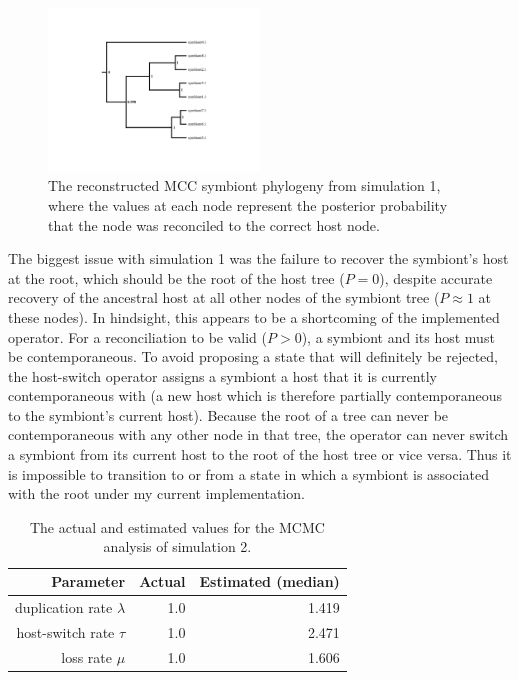 \documentclass[12pt,letterpaper]{article}
\begin{document}
\begin{figure}
\centering
\includegraphics[width=0.5\textwidth]{figures/sim2.pdf}
\caption{The reconstructed \ac{MCC} symbiont phylogeny from simulation 1, where the values at each node represent the posterior probability that the node was reconciled to the correct host node.}
\label{fig:sim1}
\end{figure}

The biggest issue with simulation 1 was the failure to recover the symbiont's host at the root, which should be the root of the host tree ($P = 0$), despite accurate recovery of the ancestral host at all other nodes of the symbiont tree ($P \approx 1$ at these nodes). In hindsight, this appears to be a shortcoming of the implemented operator. For a reconciliation to be valid ($P>0$), a symbiont and its host must be contemporaneous. To avoid proposing a state that will definitely be rejected, the host-switch operator assigns a symbiont a host that it is currently contemporaneous with (a new host which is therefore partially contemporaneous to the symbiont's current host). Because the root of a tree can never be contemporaneous with any other node in that tree, the operator can never switch a symbiont from its current host to the root of the host tree or vice versa. Thus it is impossible to transition to or from a state in which a symbiont is associated with the root under my current implementation.

\singlespacing
\begin{table}
\centering
\caption{The actual and estimated values for the \ac{MCMC} analysis of simulation 2.}
\begin{tabular}{r r r}
\toprule
\textbf{Parameter} & \textbf{Actual} & \textbf{Estimated (median)} \\
\midrule
duplication rate $\lambda$ & 1.0 & 1.419 \\
host-switch rate $\tau$ & 1.0 & 2.471 \\
loss rate $\mu$ & 1.0 & 1.606 \\
\bottomrule
\end{tabular}
\label{tab:sim2}
\end{table}
\doublespacing
\end{document}
